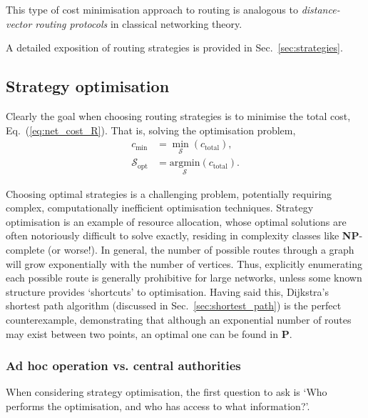 \documentclass[aps,rmp,twocolumn,amsmath,amssymb,nofootinbib,superscriptaddress,longbibliography,floatfix,table-of-contents,eqsecnum]{revtex4-1}
\begin{document}
This type of cost minimisation approach to routing is analogous to \textit{distance-vector routing protocols} in classical networking theory.

A detailed exposition of routing strategies is provided in Sec.~\ref{sec:strategies}.

%
%

\subsection{Strategy optimisation} \label{sec:strat_opt}  

Clearly the goal when choosing routing strategies is to minimise the total cost, Eq.~(\ref{eq:net_cost_R}). That is, solving the optimisation problem,
\begin{align}
c_\text{min} &= \min_\mathcal{S} (c_\text{total}), \nonumber \\
\mathcal{S}_\text{opt} &= \underset{\mathcal{S}}{\text{argmin}} (c_\text{total}).
\end{align}

Choosing optimal strategies is a challenging problem, potentially requiring complex, computationally inefficient optimisation techniques. Strategy optimisation is an example of resource allocation, whose optimal solutions are often notoriously difficult to solve exactly, residing in complexity classes like \textbf{NP}-complete (or worse!). In general, the number of possible routes through a graph will grow exponentially with the number of vertices. Thus, explicitly enumerating each possible route is generally prohibitive for large networks, unless some known structure provides `shortcuts' to optimisation. Having said this, Dijkstra's shortest path algorithm (discussed in Sec.~\ref{sec:shortest_path}) is the perfect counterexample, demonstrating that although an exponential number of routes may exist between two points, an optimal one can be found in \textbf{P}.

%
%

\subsubsection{Ad hoc operation vs. central authorities}  

When considering strategy optimisation, the first question to ask is `Who performs the optimisation, and who has access to what information?'.
\end{document}
